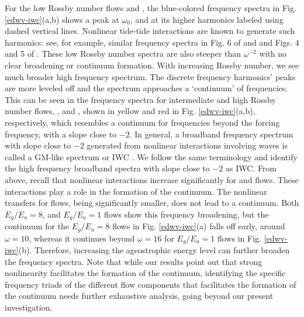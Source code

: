 \documentclass[../Rajarshi-thesis-draft.tex]{subfiles}
\begin{document}
	

For the low Rossby number flows \lre and \lro, the blue-colored frequency spectra in Fig. \ref{edwv-iwc}(a,b) shows a peak at $\omega_0$, and at its higher harmonics labeled using dashed vertical lines. Nonlinear tide-tide interactions are known to generate such harmonics: see, for example, similar frequency spectra in Fig. 6 of \citet{buijsman2025} and \citet{hiron2025} and Figs. 4 and 5 of \citet{rolland2025}. These low Rossby number spectra are also steeper than $\omega^{-2}$ with no clear broadening or continuum formation. With increasing Rossby number, we see much broader high frequency spectrum. The discrete   frequency harmonics' peaks are more leveled off and the spectrum approaches a `continuum' of frequencies. This can be seen in the frequency spectra for intermediate and high Rossby number flows, \ir, and \hr, shown in yellow and red in Fig. \ref{edwv-iwc}(a,b), respectively, which resembles  a continuum for frequencies beyond the forcing frequency, with a slope close to $-2$. In general, a broadband frequency spectrum with slope close to $-2$ generated from    nonlinear interactions involving waves  is called a GM-like spectrum or IWC \citep{BWM17,chen2019,nelson2020,delpech_etal_2024}. We follow the same terminology and identify the high frequency broadband spectra with slope close to $-2$ as IWC.  From above, recall that nonlinear interactions increase significantly for \ir and \hr flows. These interactions play a role in the formation of the continuum. The nonlinear transfers for \lr flows, being significantly smaller, does not lead to a continuum.   Both $E_g/E_a = 8$, and $E_g/E_a = 1$ flows show this frequency broadening, but the continuum for the $E_g/E_a = 8$ flows in Fig. \ref{edwv-iwc}(a) falls off early, around $\omega = 10$, whereas it continues beyond $\omega = 16$ for $E_g/E_a = 1$ flows in Fig. \ref{edwv-iwc}(b). Therefore, increasing the ageostrophic energy level can further broaden the frequency spectra.   Note that while our results point out that strong nonlinearity facilitates the formation of the continuum, identifying  the specific frequency triads of the different flow components that facilitates the formation of the continuum   needs further exhaustive analysis, going beyond our present investigation. %
 
 
 	
\end{document}
